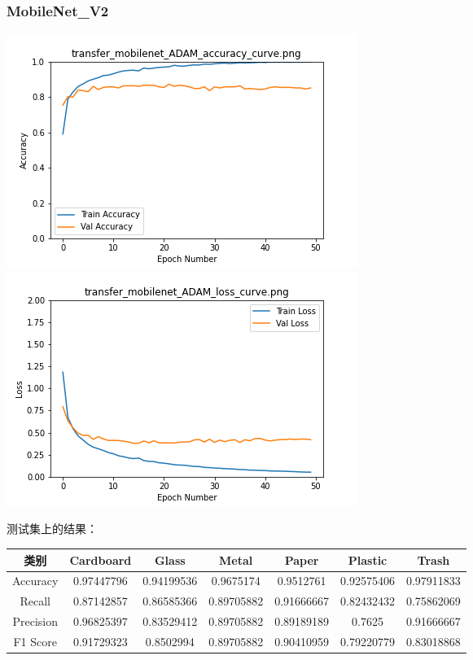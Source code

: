 \documentclass[UTF8]{ctexart}
\begin{document}
\subsubsection{MobileNet\_V2}
\includegraphics[scale=0.5]{image/transfer_mobilenet_ADAM_accuracy_curve.png} 
\includegraphics[scale=0.5]{image/transfer_mobilenet_ADAM_loss_curve.png} 
 

测试集上的结果：

\begin{tabular}{|c|c|c|c|c|c|c|}
\hline 
类别 & Cardboard & Glass & Metal & Paper & Plastic & Trash \\ 
\hline 
Accuracy &0.97447796& 0.94199536& 0.9675174 & 0.9512761  &0.92575406& 0.97911833\\
 \hline 
Recall &0.87142857 &0.86585366& 0.89705882& 0.91666667& 0.82432432& 0.75862069\\ 
\hline 
Precision &0.96825397& 0.83529412& 0.89705882 &0.89189189 &0.7625    & 0.91666667\\ 
\hline 
F1 Score &0.91729323& 0.8502994 & 0.89705882 &0.90410959& 0.79220779& 0.83018868\\ 
\hline 
\end{tabular}
\end{document}
